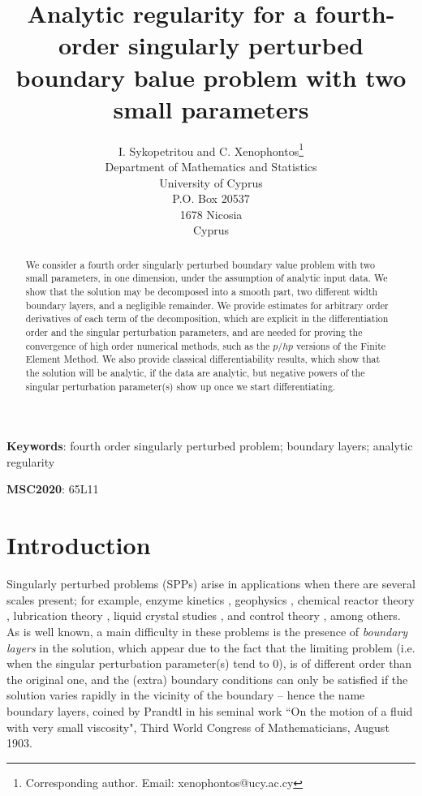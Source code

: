 \documentclass[12pt]{article}
\begin{document}
\title{Analytic regularity for a fourth-order singularly perturbed boundary balue problem with two small parameters
}
\author{I. Sykopetritou and C. Xenophontos\thanks{
Corresponding author. Email: xenophontos@ucy.ac.cy} \\
Department of Mathematics and Statistics \\
University of Cyprus \\
P.O. Box 20537 \\
1678 Nicosia \\
Cyprus}
\maketitle

\begin{abstract}
We consider a fourth order singularly perturbed boundary value problem with
two small parameters, in one dimension, under the assumption of analytic input data. We show that the solution 
may be decomposed into a smooth part, two different width boundary layers, and a negligible remainder.
We provide estimates for arbitrary order derivatives of each term of the decomposition, which are explicit in
the differentiation order and the singular perturbation parameters, and are needed for
proving the convergence of high order numerical methods, such as the $p/hp$ versions
of the Finite Element Method. We also provide classical differentiability results, which show that the solution will be analytic, if the data are analytic, but negative powers of the singular perturbation parameter(s) show up once we start differentiating.
\end{abstract}

\textbf{Keywords}: fourth order singularly perturbed problem; boundary
layers; analytic regularity

\vspace{0.5cm}

\textbf{MSC2020}: 65L11

\section{Introduction}

\label{intro}

Singularly perturbed problems (SPPs) arise in applications when there are several scales present; for example, enzyme kinetics \cite{Frank}, geophysics \cite{Carrier}, chemical reactor theory \cite{LW}, lubrication theory \cite{CC}, liquid crystal studies \cite{AM}, and control theory \cite{KOS}, among others. 
%
As is well known, a main difficulty in these problems is the
presence of \emph{boundary layers} in the solution, which appear due to the fact
that the limiting problem (i.e. when the singular perturbation parameter(s)
tend to 0), is of different order than the original one, and the (extra)
boundary conditions can only be satisfied if the solution varies rapidly in
the vicinity of the boundary -- hence the name boundary layers, coined by
Prandtl in his seminal work ``On the motion of a fluid with very small viscosity", 
Third World Congress of Mathematicians, August 1903.
\end{document}
